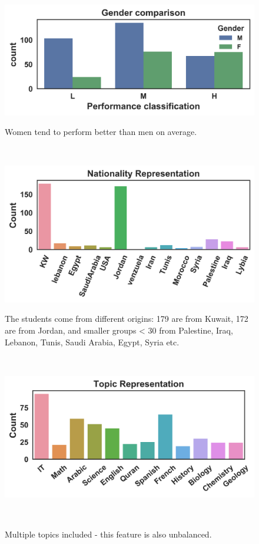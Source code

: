 \documentclass{sigchi}
\begin{document}
\begin{figure}
	\centering
		\includegraphics[width=0.95\columnwidth]{figures/gender_outcome.png}
		\caption{
			Women tend to perform better than men on average.
		}~\label{fig:gender_outcome}	
	
	\centering
	\includegraphics[width=0.95\columnwidth]{figures/nationality_bar.png}
	\caption{
		The students come from different origins: 179 are from Kuwait, 172 are from Jordan, and smaller groups < 30 from Palestine, Iraq, Lebanon, Tunis, Saudi Arabia, Egypt, Syria etc.
}~\label{fig:nationality_fig}


	\centering
	\includegraphics[width=0.95\columnwidth]{figures/topic_bar.png}
	\caption{
		Multiple topics included - this feature is also unbalanced.
	}~\label{fig:topic_bar}


\end{figure}
\end{document}
